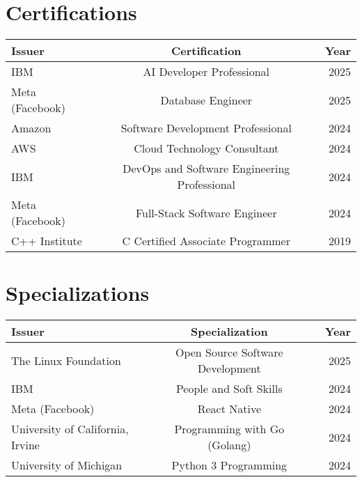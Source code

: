 \begin{samepage}
	\section{Certifications}
	\label{sec:certifications}

	\begin{tabularx}{\textwidth}{l X  c  X r}
		Issuer & & Certification & & Year \\
		\hline
		\hline
		IBM  & & AI Developer Professional & & 2025 \\
		Meta (Facebook) & & Database Engineer & & 2025 \\
		Amazon & & Software Development Professional & & 2024 \\
		AWS  & & Cloud Technology Consultant & & 2024 \\
		IBM  & & DevOps and Software Engineering Professional & & 2024 \\
		Meta (Facebook) & & Full-Stack Software Engineer & & 2024 \\
		C++ Institute & & C Certified Associate Programmer & & 2019 \\
	\end{tabularx}

	\section{Specializations}
	\label{sec:specializations}

	\begin{tabularx}{\textwidth}{l X  c  X r}
		Issuer & & Specialization & & Year \\
		\hline
		\hline
		The Linux Foundation & & Open Source Software Development & & 2025 \\
		IBM & & People and Soft Skills & & 2024 \\
		Meta (Facebook) & & React Native & & 2024 \\
		University of California, Irvine & & Programming with Go (Golang) & & 2024 \\
		University of Michigan & & Python 3 Programming & & 2024 \\
	\end{tabularx}
\end{samepage}
